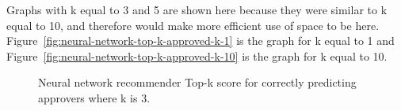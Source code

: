 Graphs with k equal to 3 and 5 are shown here because they were similar to k equal to 10, and therefore would make more efficient use of space to be here. Figure~\ref{fig:neural-network-top-k-approved-k-1} is the graph for k equal to 1 and Figure~\ref{fig:neural-network-top-k-approved-k-10} is the graph for k equal to 10.

\begin{figure}[H]%
    \centering
    \caption{Neural network recommender Top-k score for correctly predicting approvers where k is 3.}%
    \label{fig:neural-network-top-k-approved-k-3-appendix-c}%
\end{figure}

